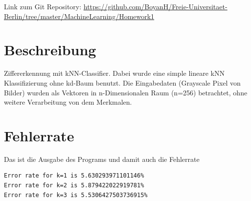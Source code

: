 \usepackage{graphicx}
\usepackage{amsmath}
\usepackage{amssymb}
\usepackage{fancyvrb}

\newcommand{\dozent}{Prof. R. Rojas}					%
\newcommand{\projectNo}{1}
\newcommand{\veranstaltung}{Mustererkennung}
\newcommand{\semester}{WS17/18}
\newcommand{\studenten}{Boyan Hristov, Matrikelnummer: 4980301}





Link zum Git Repository: \url{https://github.com/BoyanH/Freie-Universitaet-Berlin/tree/master/MachineLearning/Homework\projectNo}


\section*{Beschreibung}
Ziffererkennung mit kNN-Classifier. Dabei wurde eine simple lineare kNN Klassifizierung ohne kd-Baum benutzt.
Die Eingabedaten (Grayscale Pixel von Bilder) wurden als Vektoren in n-Dimensionalen Raum (n=256) betrachtet, ohne weitere Verarbeitung von dem Merkmalen.

\section*{Fehlerrate}
Das ist die Ausgabe des Programs und damit auch die Fehlerrate
\begin{lstlisting}
Error rate for k=1 is 5.630293971101146%
Error rate for k=2 is 5.879422022919781%
Error rate for k=3 is 5.5306427503736915%
\end{lstlisting}

